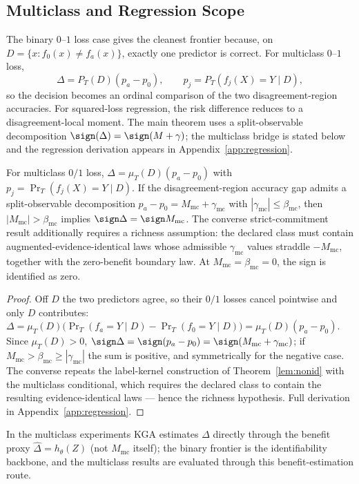 \subsection{Multiclass and Regression Scope}
The binary $0$--$1$ loss case gives the cleanest frontier because, on $D=\{x:f_0(x)\neq f_a(x)\}$, exactly one predictor is correct. For multiclass $0$--$1$ loss,
\[
\Delta=P_T(D)(p_a-p_0),\qquad p_j=P_T(f_j(X)=Y\mid D),
\]
so the decision becomes an ordinal comparison of the two disagreement-region accuracies. For squared-loss regression, the risk difference reduces to a disagreement-local moment. The main theorem uses a split-observable decomposition $\sign(\Delta)=\sign(M+\gamma)$; the multiclass bridge is stated below and the regression derivation appears in Appendix~\ref{app:regression}.

\begin{proposition}\label{prop:multiclass}
For multiclass $0/1$ loss, $\Delta=\mu_T(D)(p_a-p_0)$ with $p_j=\Pr_T(f_j(X){=}Y\mid D)$. If the
disagreement-region accuracy gap admits a split-observable decomposition
$p_a-p_0=M_{\mathrm{mc}}+\gamma_{\mathrm{mc}}$ with $|\gamma_{\mathrm{mc}}|\le\beta_{\mathrm{mc}}$, then
$|M_{\mathrm{mc}}|>\beta_{\mathrm{mc}}$ implies $\sign\Delta=\sign M_{\mathrm{mc}}$. The converse
strict-commitment result additionally requires a richness assumption: the declared class must contain
augmented-evidence-identical laws whose admissible $\gamma_{\mathrm{mc}}$ values straddle
$-M_{\mathrm{mc}}$, together with the zero-benefit boundary law. At
$M_{\mathrm{mc}}=\beta_{\mathrm{mc}}=0$, the sign is identified as zero.
\end{proposition}
\begin{proof}
Off $D$ the two predictors agree, so their $0/1$ losses cancel pointwise and only $D$ contributes:
$\Delta=\mu_T(D)\bigl(\Pr_T(f_a{=}Y\mid D)-\Pr_T(f_0{=}Y\mid D)\bigr)=\mu_T(D)(p_a-p_0)$. Since
$\mu_T(D)>0$, $\sign\Delta=\sign(p_a-p_0)=\sign(M_{\mathrm{mc}}+\gamma_{\mathrm{mc}})$; if
$M_{\mathrm{mc}}>\beta_{\mathrm{mc}}\ge|\gamma_{\mathrm{mc}}|$ the sum is positive, and symmetrically
for the negative case. The converse repeats the label-kernel construction of
Theorem~\ref{lem:nonid} with the multiclass conditional, which requires the declared class to
contain the resulting evidence-identical laws --- hence the richness hypothesis. Full derivation in
Appendix~\ref{app:regression}.
\end{proof}
\noindent In the multiclass experiments \textsc{KGA} estimates $\Delta$ directly through the benefit
proxy $\widehat\Delta=h_\theta(Z)$ (not $M_{\mathrm{mc}}$ itself); the binary frontier is the
identifiability backbone, and the multiclass results are evaluated through this benefit-estimation route.

